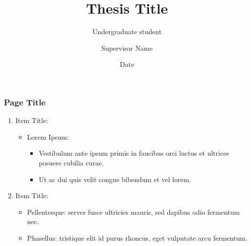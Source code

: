 \documentclass[a4paper]{beamer}
\title[]{Thesis Title}
\subtitle[]{\vspace{0.25cm} Undergraduate student }
\author[]{Supervisor Name}
\date{Date}
\begin{document}
\begin{frame}
    \maketitle
\end{frame}

\begin{frame}
    \frametitle{Page Title}
    \begin{enumerate}
        \item Item Title:
        \begin{itemize}
            \item Lorem Ipsum:
                \begin{itemize}
                    \item Vestibulum ante ipsum primis in faucibus orci luctus et ultrices posuere cubilia curae.
                    \item Ut ac dui quis velit congue bibendum et vel lorem.
                \end{itemize}
        \end{itemize}
        \item Item Title:
        \begin{itemize}
            \item Pellentesque: server fusce ultricies mauris, sed dapibus odio fermentum nec.
            \item Phasellus: tristique elit id purus rhoncus, eget vulputate arcu fermentum.
        \end{itemize}
    \end{enumerate}
\end{frame}
\end{document}
